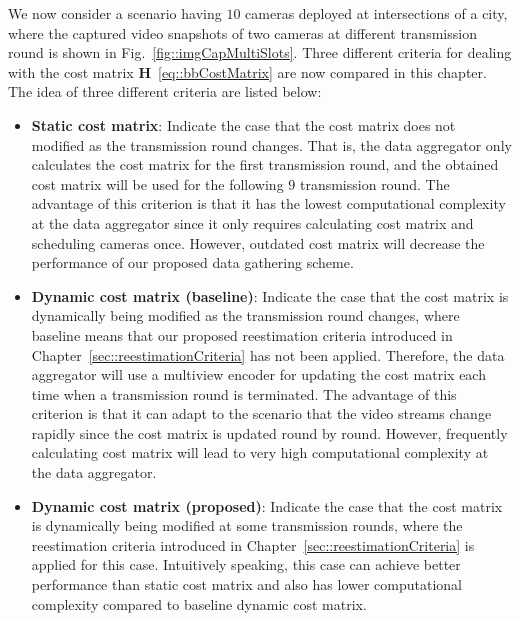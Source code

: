 We now consider a scenario having $10$ cameras deployed at intersections of a city,
where the captured video snapshots of two cameras at different transmission round is shown in Fig.~\ref{fig::imgCapMultiSlots}.
Three different criteria for dealing with the cost matrix $\mathbf{H}$~\eqref{eq::bbCostMatrix} are now compared in this chapter.
The idea of three different criteria are listed below:
\begin{itemize}
\item \textbf{Static cost matrix}: Indicate the case that the cost matrix does not modified as the transmission round changes.
That is, the data aggregator only calculates the cost matrix for the first transmission round, and the obtained cost matrix will be used for the following $9$ transmission round.
The advantage of this criterion is that it has the lowest computational complexity at the data aggregator since it only requires calculating cost matrix and scheduling cameras once.
However, outdated cost matrix will decrease the performance of our proposed data gathering scheme.
\item \textbf{Dynamic cost matrix (baseline)}: Indicate the case that the cost matrix is dynamically being modified as the transmission round changes, where baseline means that our proposed reestimation criteria introduced in Chapter~\ref{sec::reestimationCriteria} has not been applied.
Therefore, the data aggregator will use a multiview encoder for updating the cost matrix each time when a transmission round is terminated.
The advantage of this criterion is that it can adapt to the scenario that the video streams change rapidly since the cost matrix is updated round by round.
However, frequently calculating cost matrix will lead to very high computational complexity at the data aggregator.
\item \textbf{Dynamic cost matrix (proposed)}:
Indicate the case that the cost matrix is dynamically being modified at some transmission rounds, where the reestimation criteria introduced in Chapter~\ref{sec::reestimationCriteria} is applied for this case.
Intuitively speaking, this case can achieve better performance than static cost matrix and also has lower computational complexity compared to baseline dynamic cost matrix.
\end{itemize}

